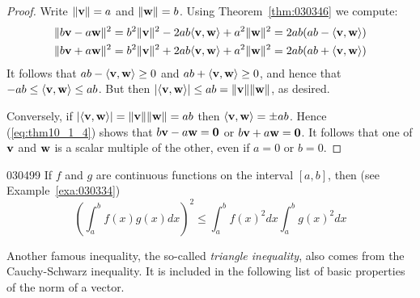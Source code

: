 \begin{proof}
Write $\|\textbf{v}\| = a$ and $\|\textbf{w}\| = b$. Using Theorem~\ref{thm:030346} we compute:
\begin{equation}
\label{eq:thm10_1_4}
\begin{split}
	\| b\textbf{v} - a \textbf{w} \|^2 &= b^2 \| \textbf{v} \|^2 - 2ab \langle \textbf{v}, \textbf{w} \rangle + a^2\| \textbf{w} \|^2 = 2ab(ab - \langle \textbf{v}, \textbf{w} \rangle) \\
	\| b\textbf{v} + a \textbf{w} \|^2 &= b^2 \| \textbf{v} \|^2 + 2ab \langle \textbf{v}, \textbf{w} \rangle + a^2\| \textbf{w} \|^2 = 2ab(ab + \langle \textbf{v}, \textbf{w} \rangle) \\
\end{split}
\end{equation}
It follows that $ab - \langle\textbf{v}, \textbf{w}\rangle \geq 0$ and
$ab + \langle\textbf{v}, \textbf{w}\rangle \geq 0$, and hence that $-ab \leq \langle\textbf{v}, \textbf{w}\rangle \leq ab$. But then $| \langle\textbf{v}, \textbf{w}\rangle | \leq ab = \|\textbf{v}\| \| \textbf{w}\|$, as desired.

Conversely, if $|\langle \textbf{v},  \textbf{w}\rangle | =
\|\textbf{v}\| \| \textbf{w} \| = ab$
then $\langle\textbf{v}, \textbf{w}\rangle = \pm ab$. Hence (\ref{eq:thm10_1_4}) shows that $b\textbf{v} - a\textbf{w} = \textbf{0}$ or $b\textbf{v} + a\textbf{w} = \textbf{0}$. It follows that one of $\textbf{v}$ and $\textbf{w}$ is a scalar multiple of the other, even if $a = 0$ or $b = 0$.
\end{proof}

\begin{example}{}{030499}
If $f$ and $g$ are continuous functions on the interval $[a, b]$, then (see Example~\ref{exa:030334})
\begin{equation*}
\left(\int_{a}^{b} f(x)g(x)dx \right) ^2 \leq \int_{a}^{b} f(x)^2 dx \int_{a}^{b} g(x)^2 dx
\end{equation*}
\end{example}

Another famous inequality, the so-called \textit{triangle inequality}, also comes from the Cauchy-Schwarz inequality. It is included in the following list of basic properties of the norm of a vector.


